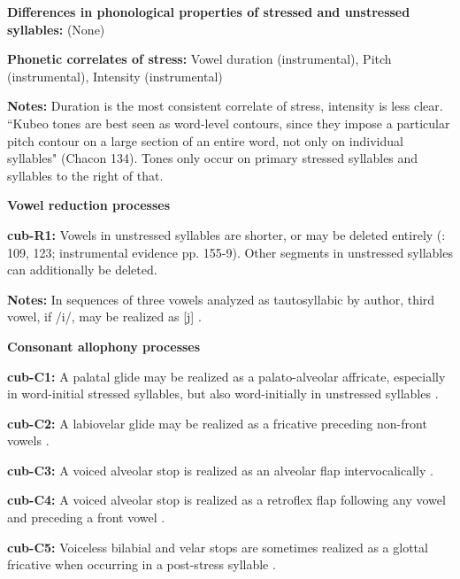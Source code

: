 \textbf{Differences in phonological properties of stressed and unstressed syllables:} (None)



\textbf{Phonetic correlates of stress:} Vowel duration (instrumental), Pitch (instrumental), Intensity (instrumental)



\textbf{Notes:} Duration is the most consistent correlate of stress, intensity is less clear. “Kubeo tones are best seen as word-level contours, since they impose a particular pitch contour on a large section of an entire word, not only on individual syllables" (Chacon 134). Tones only occur on primary stressed syllables and syllables to the right of that.



\textbf{Vowel reduction processes}



\textbf{cub-R1:} Vowels in unstressed syllables are shorter, or may be deleted entirely (\citealt{Chacon2012}: 109, 123; instrumental evidence pp. 155-9). Other segments in unstressed syllables can additionally be deleted.



\textbf{Notes:} In sequences of three vowels analyzed as tautosyllabic by author, third vowel, if /i/, may be realized as [j] \citep[52]{Chacon2012}.



\textbf{Consonant allophony processes}



\textbf{cub-C1:} A palatal glide may be realized as a palato-alveolar affricate, especially in word-initial stressed syllables, but also word-initially in unstressed syllables \citep[67]{Chacon2012}.



\textbf{cub-C2:} A labiovelar glide may be realized as a fricative preceding non-front vowels \citep[63]{Chacon2012}.



\textbf{cub-C3:} A voiced alveolar stop is realized as an alveolar flap intervocalically \citep[63]{Chacon2012}.



\textbf{cub-C4:} A voiced alveolar stop is realized as a retroflex flap following any vowel and preceding a front vowel \citep[6]{Chacon2012}.



\textbf{cub-C5:} Voiceless bilabial and velar stops are sometimes realized as a glottal fricative when occurring in a post-stress syllable \citep[123]{Chacon2012}.



